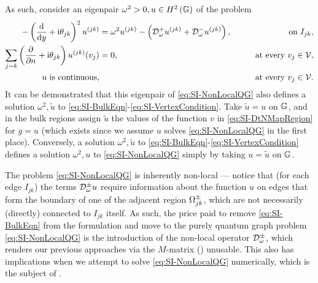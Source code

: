 As such, consider an eigenpair $\omega^2>0, u\in H^2\left( \mathbb{G} \right)$ of the problem
\begin{subequations} \label{eq:SI-NonLocalQG}
	\begin{align}
		- \left( \dfrac{\mathrm{d}}{\mathrm{d}y} + \mathrm{i}\theta_{jk} \right)^2u^{(jk)} 
		&= \omega^2 u^{(jk)} - \left(  \mathcal{D}^+_\omega u^{(jk)} + \mathcal{D}^-_\omega u^{(jk)} \right),
		&\qquad\text{on } I_{jk}, \label{eq:SI-NonLocalQGEdgeEquation}  \\
		\sum_{j\sim k} \left( \dfrac{\partial }{\partial n}+\mathrm{i}\theta_{jk} \right) u^{(jk)}(v_j) &= 0,
		&\qquad\text{at every } v_j\in\mathcal{V}, \label{eq:SI-NonLocalQGVertexDeriv} \\
		u \text{ is continuous,} & 
		&\qquad\text{at every } v_j\in\mathcal{V}. \label{eq:SI-NonLocalQGVertexCont}
	\end{align}
\end{subequations}
It can be demonstrated that this eigenpair of \eqref{eq:SI-NonLocalQG} also defines a solution $\omega^2, \tilde{u}$ to \eqref{eq:SI-BulkEqn}-\eqref{eq:SI-VertexCondition}.
Take $\tilde{u}=u$ on $\mathbb{G}$, and in the bulk regions assign $\tilde{u}$ the values of the function $v$ in \eqref{eq:SI-DtNMapRegion} for $g=u$ (which exists since we assume $u$ solves \eqref{eq:SI-NonLocalQG} in the first place).
Conversely, a solution $\omega^2, \tilde{u}$ to \eqref{eq:SI-BulkEqn}-\eqref{eq:SI-VertexCondition} defines a solution $\omega^2, u$ to \eqref{eq:SI-NonLocalQG} simply by taking $u = \tilde{u}$ on $\mathbb{G}$. 

The problem \eqref{eq:SI-NonLocalQG} is inherently non-local --- notice that (for each edge $I_{jk}$) the terms $\mathcal{D}^{\pm}_\omega u$ require information about the function $u$ on edges that form the boundary of one of the adjacent region $\Omega_{jk}^{\pm}$, which are not necessarily (directly) connected to $I_{jk}$ itself.
As such, the price paid to remove \eqref{eq:SI-BulkEqn} from the formulation and move to the purely quantum graph problem \eqref{eq:SI-NonLocalQG} is the introduction of the non-local operator $\mathcal{D}^{\pm}_\omega$, which renders our previous approaches via the $M$-matrix () unusable.
This also has implications when we attempt to solve \eqref{eq:SI-NonLocalQG} numerically, which is the subject of .

